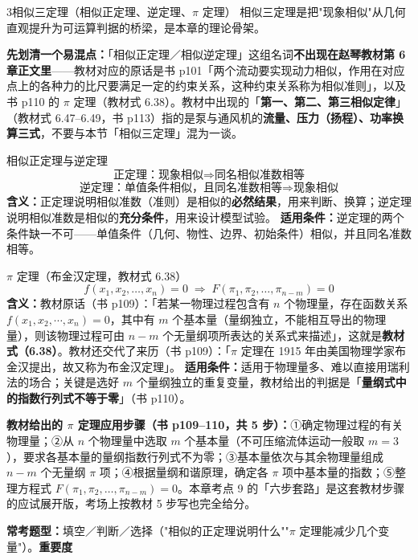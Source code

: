 \begin{kaodian}{3}{相似三定理（相似正定理、逆定理、$\pi$ 定理）}
相似三定理是把"现象相似"从几何直观提升为可运算判据的桥梁，是本章的理论骨架。

\textbf{先划清一个易混点：}「相似正定理／相似逆定理」这组名词\textbf{不出现在赵琴教材第 6 章正文里}——教材对应的原话是书 p101「两个流动要实现动力相似，作用在对应点上的各种力的比尺要满足一定的约束关系，这种约束关系称为相似准则」，以及书 p110 的 $\pi$ 定理（教材式 6.38）。教材中出现的「\textbf{第一、第二、第三相似定律}」（教材式 6.47--6.49，书 p113）指的是泵与通风机的\textbf{流量、压力（扬程）、功率换算三式}，不要与本节「相似三定理」混为一谈。

\begin{gongshi}{相似正定理与逆定理}
\[ \text{正定理：现象相似} \Rightarrow \text{同名相似准数相等} \]
\[ \text{逆定理：单值条件相似，且同名准数相等} \Rightarrow \text{现象相似} \]
\textbf{含义：}正定理说明相似准数（准则）是相似的\textbf{必然结果}，用来判断、换算；逆定理说明相似准数是相似的\textbf{充分条件}，用来设计模型试验。
\textbf{适用条件：}逆定理的两个条件缺一不可——单值条件（几何、物性、边界、初始条件）相似，并且同名准数相等。
\end{gongshi}

\begin{gongshi}{$\pi$ 定理（布金汉定理，教材式 6.38）}
\[ f(x_1,x_2,\dots,x_n)=0 \;\Longrightarrow\; F(\pi_1,\pi_2,\dots,\pi_{n-m})=0 \]
\textbf{含义：}教材原话（书 p109）：「若某一物理过程包含有 $n$ 个物理量，存在函数关系 $f(x_1,x_2,\cdots,x_n)=0$，其中有 $m$ 个基本量（量纲独立，不能相互导出的物理量），则该物理过程可由 $n-m$ 个无量纲项所表达的关系式来描述」，这就是\textbf{教材式（6.38）}。教材还交代了来历（书 p109）：「$\pi$ 定理在 1915 年由美国物理学家布金汉提出，故又称为布金汉定理」。
\textbf{适用条件：}适用于物理量多、难以直接用瑞利法的场合；关键是选好 $m$ 个量纲独立的重复变量，教材给出的判据是「\textbf{量纲式中的指数行列式不等于零}」（书 p110）。
\end{gongshi}

\textbf{教材给出的 $\pi$ 定理应用步骤（书 p109--110，共 5 步）：}①确定物理过程的有关物理量；②从 $n$ 个物理量中选取 $m$ 个基本量（不可压缩流体运动一般取 $m=3$），要求各基本量的量纲指数行列式不为零；③基本量依次与其余物理量组成 $n-m$ 个无量纲 $\pi$ 项；④根据量纲和谐原理，确定各 $\pi$ 项中基本量的指数；⑤整理方程式 $F(\pi_1,\pi_2,\dots,\pi_{n-m})=0$。本章考点 9 的「六步套路」是这套教材步骤的应试展开版，考场上按教材 5 步写也完全给分。

\textbf{常考题型：}填空／判断／选择（"相似的正定理说明什么""$\pi$ 定理能减少几个变量"）。\quad\textbf{重要度 }\quad{}\quad{}
\end{kaodian}


